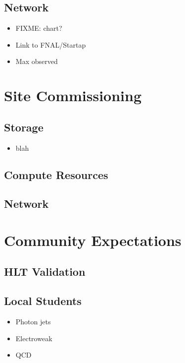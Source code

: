 \documentclass{beamer}
\begin{document}
\subsection{Network}
\begin{frame}
\begin{itemize}
    \item FIXME: chart?
    \item Link to FNAL/Startap
    \item Max observed
\end{itemize}
\end{frame}

\section{Site Commissioning}
\subsection{Storage}
\begin{frame}
\begin{itemize}
    \item blah
\end{itemize}
\end{frame}

\subsection{Compute Resources}
\begin{frame}
\end{frame}

\subsection{Network}
\begin{frame}
\end{frame}

\section{Community Expectations}
\subsection{HLT Validation}
\begin{frame}
\end{frame}

\subsection{Local Students}
\begin{frame}
\begin{itemize}
    \item Photon jets
    \item Electroweak
    \item QCD
\end{itemize}
\end{frame}
\end{document}
